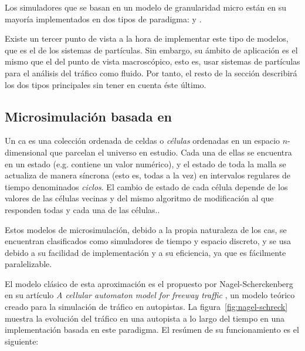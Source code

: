 Los simuladores que se basan en un modelo de granularidad micro están en su mayoría implementados en dos tipos de paradigma:  y .

Existe un tercer punto de vista a la hora de implementar este tipo de modelos, que es el de los sistemas de partículas. Sin embargo, su ámbito de aplicación es el mismo que el del punto de vista macroscópico, esto es, usar sistemas de partículas para el análisis del tráfico como fluido. Por tanto, el resto de la sección describirá los dos tipos principales sin tener en cuenta éste último.

\subsection{Microsimulación basada en }

Un \ac{ca} es una colección ordenada de celdas o \textit{células} ordenadas en un espacio $n$-dimensional que parcelan el universo en estudio. Cada una de ellas se encuentra en un estado (e.g. contiene un valor numérico), y el estado de toda la malla se actualiza de manera síncrona (esto es, todas a la vez) en intervalos regulares de tiempo denominados \textit{ciclos}. El cambio de estado de cada célula depende de los valores de las células vecinas y del mismo algoritmo de modificación al que responden todas y cada una de las células..

Estos modelos de microsimulación, debido a la propia naturaleza de los \acp{ca}, se encuentran clasificados como simuladores de tiempo y espacio discreto, y se usa debido a su facilidad de implementación y a su eficiencia, ya que es fácilmente paralelizable.

El modelo clásico de esta aproximación es el propuesto por Nagel-Scherckenberg en su artículo \textit{A cellular automaton model for freeway traffic} \cite{Nagel1992}, un modelo teórico creado para la simulación de tráfico en autopistas. La figura~\ref{fig:nagel-schreck} muestra la evolución del tráfico en una autopista a lo largo del tiempo en una implementación basada en este paradigma. El resúmen de su funcionamiento es el siguiente:

